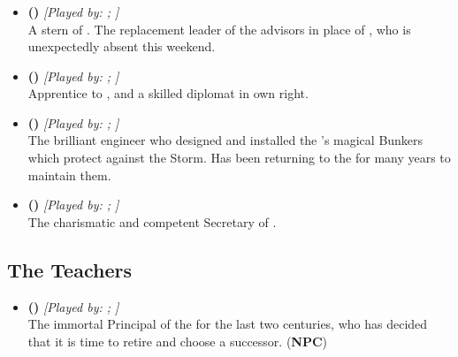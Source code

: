 \documentclass[blue]{GL2020}
\begin{document}
\subsubsection*{\pShip{}}
\begin{itemize}
    \item \textbf{\cEbbPriest{\full} (\cEbbPriest{\MYcharpronouns})} \textit{[Played by: \cEbbPriest{\MYplayer}; \cEbbPriest{\MYplayerpronouns}]}\\ A stern \cEbbPriest{\cleric} of \cEbb{}. The replacement leader of the \pShip{} advisors in place of \cHeadDiplomat{\full}, who is unexpectedly absent this weekend.

    \item \textbf{\cJuniorStatesman{\full} (\cJuniorStatesman{\MYcharpronouns})} \textit{[Played by: \cJuniorStatesman{\MYplayer}; \cJuniorStatesman{\MYplayerpronouns}]}\\ Apprentice to \cHeadDiplomat{}, and a skilled diplomat in \cJuniorStatesman{\their} own right.
    
    \item \textbf{\cBunker{\full} (\cBunker{\MYcharpronouns})} \textit{[Played by: \cBunker{\MYplayer}; \cBunker{\MYplayerpronouns}]}\\ The brilliant engineer who designed and installed the \pSc{}'s magical Bunkers which protect against the Storm. Has been returning to the \pSc{} for many years to maintain them.
    
    \item \textbf{\cChupLeader{\full} (\cChupLeader{\MYcharpronouns})} \textit{[Played by: \cChupLeader{\MYplayer}; \cChupLeader{\MYplayerpronouns}]}\\ The charismatic and competent Secretary of \cHeadDiplomat{}.

\end{itemize}

\subsection*{The Teachers}

\begin{itemize}
    \item \textbf{\cPrincipal{\full} (\cPrincipal{\MYcharpronouns})} \textit{[Played by: \cPrincipal{\MYplayer}; \cPrincipal{\MYplayerpronouns}]}\\ The immortal Principal of the \pSc{} for the last two centuries, who has decided that it is time to retire and choose a successor. (\textbf{NPC})
\end{itemize}
\end{document}
